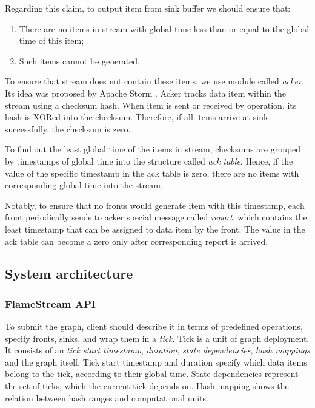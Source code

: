Regarding this claim, to output item from sink buffer we should ensure that:
\begin{enumerate}
    \item There are no items in stream with global time less than or equal to the global time of this item;
    \item Such items cannot be generated.
\end{enumerate}

To ensure that stream does not contain these items, we use module called {\it acker}. Its idea was proposed by Apache Storm \cite{apache:storm}. Acker tracks data item within the stream using a checksum hash. When item is sent or received by operation, its hash is XORed into the checksum. Therefore, if all items arrive at sink successfully, the checksum is zero. 

To find out the least global time of the items in stream, checksums are grouped by timestamps of global time into the structure called {\it ack table}. Hence, if the value of the specific timestamp in the ack table is zero, there are no items with corresponding global time into the stream. 

Notably, to ensure that no fronts would generate item with this timestamp, each front periodically sends to acker special message called {\it report}, which contains the least timestamp that can be assigned to data item by the front. The value in the ack table can become a zero only after corresponding report is arrived.  

\subsection{System architecture}

\subsubsection{FlameStream API}
To submit the graph, client should describe it in terms of predefined operations, specify fronts, sinks, and wrap them in a {\it tick}. Tick is a unit of graph deployment. It consists of an {\it tick start timestamp}, {\it duration}, {\it state dependencies}, {\it hash mappings} and the graph itself. Tick start timestamp and duration specify which data items belong to the tick, according to their global time. State dependencies represent the set of ticks, which the current tick depends on. Hash mapping shows the relation between hash ranges and computational units. 

